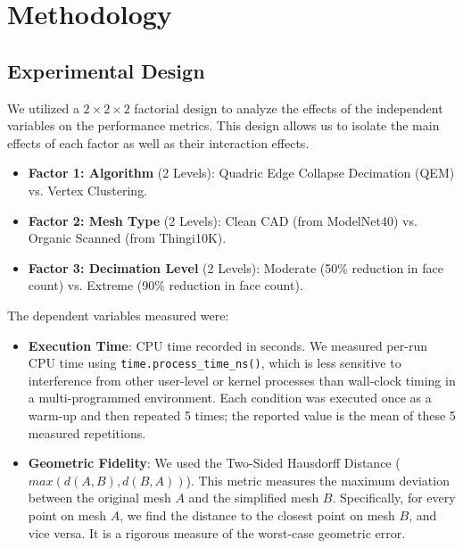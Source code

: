 \section{Methodology}

\subsection{Experimental Design}
We utilized a $2 \times 2 \times 2$ factorial design to analyze the effects of the independent variables on the performance metrics. This design allows us to isolate the main effects of each factor as well as their interaction effects.
\begin{itemize}
    \item \textbf{Factor 1: Algorithm} (2 Levels): Quadric Edge Collapse Decimation (QEM) vs. Vertex Clustering.
    \item \textbf{Factor 2: Mesh Type} (2 Levels): Clean CAD (from ModelNet40) vs. Organic Scanned (from Thingi10K).
    \item \textbf{Factor 3: Decimation Level} (2 Levels): Moderate (50\% reduction in face count) vs. Extreme (90\% reduction in face count).
\end{itemize}

The dependent variables measured were:
\begin{itemize}
    \item \textbf{Execution Time}: CPU time recorded in seconds. We measured per-run CPU time using \texttt{time.process\_time\_ns()}, which is less sensitive to interference from other user-level or kernel processes than wall-clock timing in a multi-programmed environment. Each condition was executed once as a warm-up and then repeated 5 times; the reported value is the mean of these 5 measured repetitions.
    \item \textbf{Geometric Fidelity}: We used the Two-Sided Hausdorff Distance \cite{cignoni1998metro} ($max(d(A,B), d(B,A))$). This metric measures the maximum deviation between the original mesh $A$ and the simplified mesh $B$. Specifically, for every point on mesh $A$, we find the distance to the closest point on mesh $B$, and vice versa. It is a rigorous measure of the worst-case geometric error.
\end{itemize}

